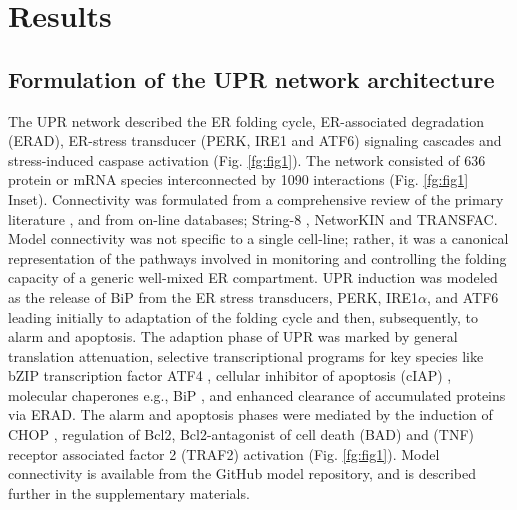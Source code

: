 \documentclass[fleqn,10pt]{wlscirep}
\begin{document}
\section*{Results}

\subsection*{Formulation of the UPR network architecture}
The UPR network described the ER folding cycle, ER-associated degradation (ERAD), ER-stress transducer (PERK, IRE1 and ATF6) signaling cascades and stress-induced caspase activation (Fig. \ref{fg:fig1}).
The network consisted of 636 protein or mRNA species interconnected by 1090 interactions (Fig. \ref{fg:fig1} Inset).
Connectivity was formulated from a comprehensive review of the primary literature  \cite{naidoo2009er, ron2002translational, kaufman2002unfolded,ellgaard2003qce,Fonseca:2009fk,Schroder:2005vn,gotoh:hdc,mccullough2001gsc, belmont2008cga,Hetz:2009qc,Urano:2000uq,szegezdi2006mediators}, and from on-line databases; String-8 \cite{Jensen:2009fk}, NetworKIN \cite{Linding:2007fk} and TRANSFAC.
Model connectivity was not specific to a single cell-line; rather, it was a canonical representation of the pathways involved in monitoring and controlling the folding capacity of a generic well-mixed ER compartment.
UPR induction was modeled as the release of BiP from the ER stress transducers, PERK, IRE1$\alpha$, and ATF6 leading initially to adaptation of the folding cycle and then, subsequently, to alarm and apoptosis.
The adaption phase of UPR was marked by general translation attenuation, selective transcriptional programs for key species like bZIP transcription factor ATF4 \cite{lu2004tra}, cellular inhibitor of apoptosis (cIAP) \cite{hamanaka2008pdr}, molecular chaperones e.g., BiP \cite{harding2003isr}, and enhanced clearance of accumulated proteins via ERAD.
The alarm and apoptosis phases were mediated by the induction of CHOP \cite{ron1992cnd}, regulation of Bcl2, Bcl2-antagonist of cell death (BAD) \cite {wang1999cia} and (TNF) receptor associated factor 2 (TRAF2) \cite{lei2003jpb,putcha2003jmb, yamamoto1999bpa, szegezdi2006mediators} activation (Fig. \ref{fg:fig1}).
Model connectivity is available from the GitHub model repository, and is described further in the supplementary materials.


\end{document}
